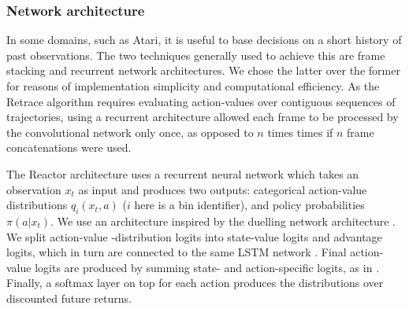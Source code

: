\documentclass{article}
\begin{document}


\subsubsection{Network architecture}\label{sec:net_arch}
In some domains, such as Atari, it is useful to base decisions on a 
short history of past observations. The two techniques generally used to 
achieve this are frame stacking and recurrent network architectures. We 
chose the latter over the former for reasons 
of implementation simplicity and computational 
efficiency. As the Retrace algorithm requires evaluating action-values over contiguous 
sequences of trajectories, using a recurrent architecture allowed each frame to 
be processed by the convolutional network only once, as opposed to $n$ times 
times if $n$ frame concatenations were used. 

The Reactor architecture uses a recurrent neural network which 
takes an observation $x_t$ as input and produces two outputs:  
categorical action-value distributions $q_i(x_t, a)$ ($i$ here is a bin 
identifier), and policy probabilities $\pi(a|x_t)$. 
We use an architecture inspired by the duelling network architecture 
\citep{wang2015dueling}. We split action-value -distribution logits into 
state-value logits and advantage logits, which 
in turn are connected to the same LSTM network \citep{hochreiter1997long}.
Final action-value logits are produced by summing state- and action-specific 
logits, as in \citet{wang2015dueling}. Finally, a softmax layer on top for each action produces the distributions over discounted 
future returns.
\end{document}
